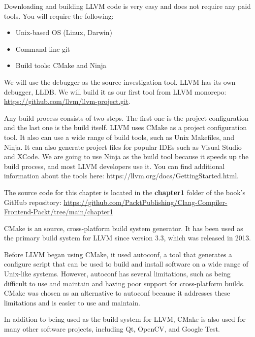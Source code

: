 Downloading and building LLVM code is very easy and does not require any paid tools. You will require the following:

\begin{itemize}
\item
Unix-based OS (Linux, Darwin)

\item
Command line git

\item
Build tools: CMake and Ninja
\end{itemize}

We will use the debugger as the source investigation tool. LLVM has its own debugger, LLDB. We will build it as our first tool from LLVM monorepo: \url{https://github.com/llvm/llvm-project.git}.

Any build process consists of two steps. The first one is the project configuration and the last one is the build itself. LLVM uses CMake as a project configuration tool. It also can use a wide range of build tools, such as Unix Makefiles, and Ninja. It can also generate project files for popular IDEs such as Visual Studio and XCode. We are going to use Ninja as the build tool because it speeds up the build process, and most LLVM developers use it. You can find additional information about the tools here: https://llvm.org/docs/GettingStarted.html.

The source code for this chapter is located in the \textbf{chapter1} folder of the book’s GitHub repository: \url{https://github.com/PacktPublishing/Clang-Compiler-Frontend-Packt/tree/main/chapter1}



CMake is an source, cross-platform build system generator. It has been used as the primary build system for LLVM since version 3.3, which was released in 2013.

Before LLVM began using CMake, it used autoconf, a tool that generates a configure script that can be used to build and install software on a wide range of Unix-like systems. However, autoconf has several limitations, such as being difficult to use and maintain and having poor support for cross-platform builds. CMake was chosen as an alternative to autoconf because it addresses these limitations and is easier to use and maintain.

In addition to being used as the build system for LLVM, CMake is also used for many other software projects, including Qt, OpenCV, and Google Test.


